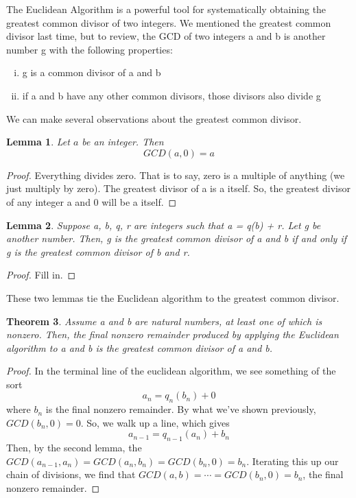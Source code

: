 \documentclass{article}
\newtheorem{theorem}{Theorem}
\newtheorem{lemma}[theorem]{Lemma}
\begin{document}
The Euclidean Algorithm is a powerful tool for systematically obtaining the greatest common divisor of two integers.
We mentioned the greatest common divisor last time, but to review, the GCD of two integers a and b is another number g with the following properties:
\begin{enumerate}[(i)] 
\item g is a common divisor of a and b 
\item if a and b have any other common divisors, those divisors also divide g 
\end{enumerate} 
We can make several observations about the greatest common divisor. 
\begin{mdframed} 
\begin{lemma} Let $a$ be an integer. Then 
\[GCD(a, 0) = a\]
\end{lemma}  
\begin{proof} Everything divides zero. That is to say, zero is a multiple of anything (we just multiply by zero). The greatest divisor of a is a itself. So, the greatest divisor of any integer a and 0 will be a itself. 
\end{proof}
\end{mdframed} 
\begin{mdframed} 
\begin{lemma}Suppose a, b, q, r are integers such that a = q(b) + r. Let g be another number. Then, g is the greatest common divisor of a and b if and only if g is the greatest common divisor of b and r.
\end{lemma} 
\begin{proof}
Fill in. 
\end{proof} 
\end{mdframed} 
These two lemmas tie the Euclidean algorithm to the greatest common divisor.
\begin{mdframed}
\begin{theorem}
Assume a and b are natural numbers, at least one of which is nonzero. Then, the final nonzero remainder produced by applying the Euclidean algorithm to a and b is the greatest common divisor of a and b. 
\end{theorem}
\begin{proof} In the terminal line of the euclidean algorithm, we see something of the sort 
\[a_n = q_n(b_n) + 0\] 
where $b_n$ is the final nonzero remainder. By what we’ve shown previously, $GCD(b_n, 0) = 0$. So, we walk up a line, which gives 
\[a_{n-1} = q_{n-1}(a_n) + b_n\]
Then, by the second lemma, the \(GCD(a_{n-1}, a_n) = GCD(a_n, b_n) = GCD(b_n, 0) = b_n\). 
Iterating this up our chain of divisions, we find that \(GCD(a, b) = \cdots = GCD(b_n, 0) = b_n\), the final nonzero remainder. 
\end{proof} 
\end{mdframed} 
\end{document}
